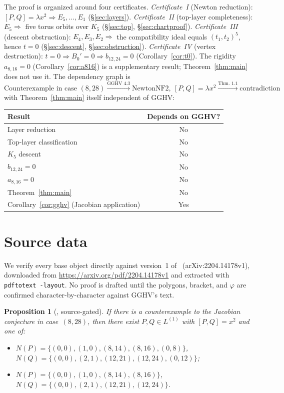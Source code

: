 \documentclass[a4paper,11pt]{article}
\theoremstyle{plain}
\newtheorem{proposition}[theorem]{Proposition}
\theoremstyle{definition}
\theoremstyle{remark}
\begin{document}
The proof is organized around four certificates. \emph{Certificate~I} (Newton reduction): $[P,Q]=\lambda x^2\Rightarrow E_5,\dots,E_1$ (\S\ref{sec:layers}). \emph{Certificate~II} (top-layer completeness): $E_5\Rightarrow$ five torus orbits over $K_5$ (\S\ref{sec:top}, \S\ref{sec:chartproof}). \emph{Certificate~III} (descent obstruction): $E_4,E_3,E_2\Rightarrow$ the compatibility ideal equals $(t_1,t_2)^5$, hence $t=0$ (\S\ref{sec:descent}, \S\ref{sec:obstruction}). \emph{Certificate~IV} (vertex destruction): $t=0\Rightarrow B_0'=0\Rightarrow b_{12,24}=0$ (Corollary~\ref{cor:t0}). The rigidity $a_{8,16}=0$ (Corollary~\ref{cor:a816}) is a supplementary result; Theorem~\ref{thm:main} does not use it. The dependency graph is
\[
\boxed{\text{Counterexample in case }(8,28)\xrightarrow{\text{GGHV 4.3}} \text{NewtonNF2},\ [P,Q]=\lambda x^2 \xrightarrow{\text{Thm.~1.1}} \text{contradiction}}
\]
with Theorem~\ref{thm:main} itself independent of GGHV:
\begin{center}
\begin{tabular}{l|c}
\textbf{Result} & \textbf{Depends on GGHV?} \\ \midrule
Layer reduction & No \\
Top-layer classification & No \\
$K_5$ descent & No \\
$b_{12,24}=0$ & No \\
$a_{8,16}=0$ & No \\
Theorem~\ref{thm:main} & No \\
Corollary~\ref{cor:gghv} (Jacobian application) & Yes
\end{tabular}
\end{center}

\section{Source data}\label{sec:source}

We verify every base object directly against version~1 of~\cite{GGHV} (arXiv:2204.14178v1), downloaded from \url{https://arxiv.org/pdf/2204.14178v1} and extracted with \texttt{pdftotext -layout}. No proof is drafted until the polygons, bracket, and $\varphi$ are confirmed character-by-character against GGHV's text.

\begin{proposition}[{\cite[Proposition~4.3]{GGHV}, source-gated}]\label{prop:gghv43}
If there is a counterexample to the Jacobian conjecture in case~$(8,28)$, then there exist $P,Q\in L^{(1)}$ with $[P,Q]=x^2$ and one of:
\begin{itemize}[nosep]
\item[(1)] $N(P)=\{(0,0),(1,0),(8,14),(8,16),(0,8)\}$,\\
$N(Q)=\{(0,0),(2,1),(12,21),(12,24),(0,12)\}$;
\item[(2)] $N(P)=\{(0,0),(1,0),(8,14),(8,16)\}$,\\
$N(Q)=\{(0,0),(2,1),(12,21),(12,24)\}$.
\end{itemize}
\end{proposition}
\end{document}
